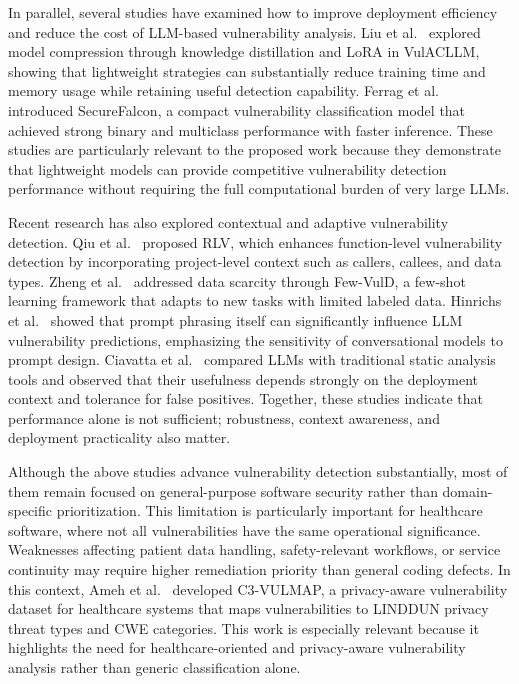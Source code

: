 \documentclass[conference]{IEEEtran}
\begin{document}
In parallel, several studies have examined how to improve deployment efficiency and reduce the cost of LLM-based vulnerability analysis. Liu et al.~\cite{liu2025} explored model compression through knowledge distillation and LoRA in VulACLLM, showing that lightweight strategies can substantially reduce training time and memory usage while retaining useful detection capability. Ferrag et al.~\cite{ferrag2025} introduced SecureFalcon, a compact vulnerability classification model that achieved strong binary and multiclass performance with faster inference. These studies are particularly relevant to the proposed work because they demonstrate that lightweight models can provide competitive vulnerability detection performance without requiring the full computational burden of very large LLMs.

Recent research has also explored contextual and adaptive vulnerability detection. Qiu et al.~\cite{qiu2026} proposed RLV, which enhances function-level vulnerability detection by incorporating project-level context such as callers, callees, and data types. Zheng et al.~\cite{zheng2024} addressed data scarcity through Few-VulD, a few-shot learning framework that adapts to new tasks with limited labeled data. Hinrichs et al.~\cite{hinrichs2025} showed that prompt phrasing itself can significantly influence LLM vulnerability predictions, emphasizing the sensitivity of conversational models to prompt design. Ciavatta et al.~\cite{ciavatta2026} compared LLMs with traditional static analysis tools and observed that their usefulness depends strongly on the deployment context and tolerance for false positives. Together, these studies indicate that performance alone is not sufficient; robustness, context awareness, and deployment practicality also matter.

Although the above studies advance vulnerability detection substantially, most of them remain focused on general-purpose software security rather than domain-specific prioritization. This limitation is particularly important for healthcare software, where not all vulnerabilities have the same operational significance. Weaknesses affecting patient data handling, safety-relevant workflows, or service continuity may require higher remediation priority than general coding defects. In this context, Ameh et al.~\cite{ameh2025} developed C3-VULMAP, a privacy-aware vulnerability dataset for healthcare systems that maps vulnerabilities to LINDDUN privacy threat types and CWE categories. This work is especially relevant because it highlights the need for healthcare-oriented and privacy-aware vulnerability analysis rather than generic classification alone.
\end{document}
